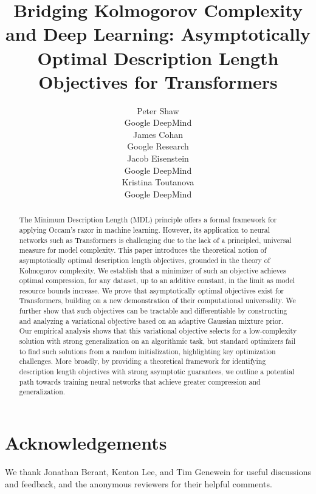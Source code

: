 \documentclass{article} %
\title{Bridging Kolmogorov Complexity and Deep Learning: Asymptotically Optimal Description Length Objectives for Transformers}
\author{
Peter Shaw \\
Google DeepMind \\
\And
James Cohan \\
Google Research \\
\And
Jacob Eisenstein \\
Google DeepMind \\
\And 
Kristina Toutanova \\
Google DeepMind \\
}
\begin{document}
\maketitle

\begin{abstract}
The Minimum Description Length (MDL) principle offers a formal framework for applying Occam's razor in machine learning. However, its application to neural networks such as Transformers is challenging due to the lack of a principled, universal measure for model complexity.
This paper introduces the theoretical notion of asymptotically optimal description length objectives, grounded in the theory of Kolmogorov complexity. We establish that a minimizer of such an objective achieves optimal compression, for any dataset, up to an additive constant, in the limit as model resource bounds increase.
We prove that asymptotically optimal objectives exist for Transformers, building on a new demonstration of their computational universality. We further show that such objectives can be tractable and differentiable by constructing and analyzing a variational objective based on an adaptive Gaussian mixture prior.
Our empirical analysis shows that this variational objective selects for a low-complexity solution with strong generalization on an algorithmic task, but standard optimizers fail to find such solutions from a random initialization, highlighting key optimization challenges. More broadly, by providing a theoretical framework for identifying description length objectives with strong asymptotic guarantees, we outline a potential path towards training neural networks that achieve greater compression and generalization.
\end{abstract}










\clearpage


\section*{Acknowledgements} We thank Jonathan Berant, Kenton Lee, and Tim Genewein
for useful discussions and feedback, and the anonymous reviewers for their helpful comments.




\clearpage
\appendix


\end{document}
